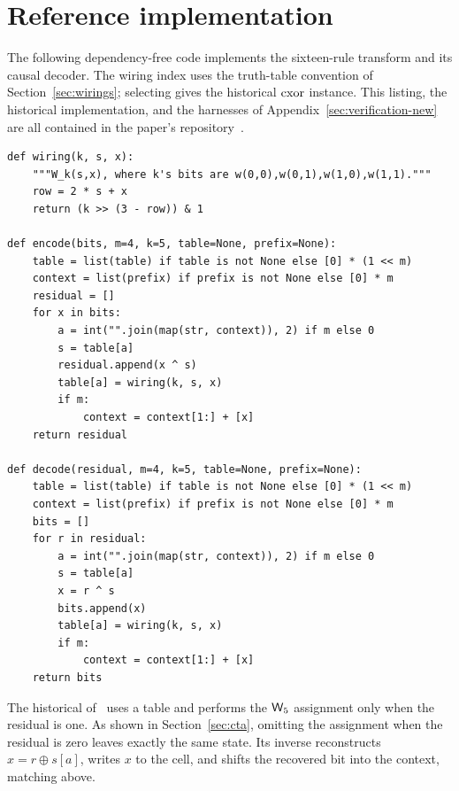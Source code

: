 \section{Reference implementation}\label{sec:implementation-new}

The following dependency-free code implements the sixteen-rule transform and its causal decoder.
The wiring index uses the truth-table convention of Section~\ref{sec:wirings}; selecting
 gives the historical $\mathrm{cxor}$ instance.  This listing, the historical implementation,
and the harnesses of Appendix~\ref{sec:verification-new} are all contained in the paper's
repository~\cite{cxorrepo}.

\begin{lstlisting}
def wiring(k, s, x):
    """W_k(s,x), where k's bits are w(0,0),w(0,1),w(1,0),w(1,1)."""
    row = 2 * s + x
    return (k >> (3 - row)) & 1

def encode(bits, m=4, k=5, table=None, prefix=None):
    table = list(table) if table is not None else [0] * (1 << m)
    context = list(prefix) if prefix is not None else [0] * m
    residual = []
    for x in bits:
        a = int("".join(map(str, context)), 2) if m else 0
        s = table[a]
        residual.append(x ^ s)
        table[a] = wiring(k, s, x)
        if m:
            context = context[1:] + [x]
    return residual

def decode(residual, m=4, k=5, table=None, prefix=None):
    table = list(table) if table is not None else [0] * (1 << m)
    context = list(prefix) if prefix is not None else [0] * m
    bits = []
    for r in residual:
        a = int("".join(map(str, context)), 2) if m else 0
        s = table[a]
        x = r ^ s
        bits.append(x)
        table[a] = wiring(k, s, x)
        if m:
            context = context[1:] + [x]
    return bits
\end{lstlisting}

The historical  of~\cite{cxorrepo} uses a  table and performs the $\mathsf{W}_{5}$ assignment only
when the residual is one.  As shown in Section~\ref{sec:cta}, omitting the assignment when the
residual is zero leaves exactly the same state.  Its inverse reconstructs $x=r\oplus s[a]$, writes
$x$ to the cell, and shifts the recovered bit into the context, matching 
above.
